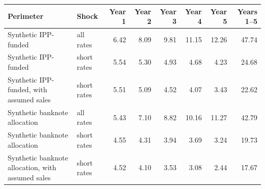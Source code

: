 \begin{tabular}{llrrrrrr}
\toprule
Perimeter & Shock & Year 1 & Year 2 & Year 3 & Year 4 & Year 5 & Years 1--5 \\
\midrule
Synthetic IPP-funded & all rates & 6.42 & 8.09 & 9.81 & 11.15 & 12.26 & 47.74 \\
Synthetic IPP-funded & short rates & 5.54 & 5.30 & 4.93 & 4.68 & 4.23 & 24.68 \\
Synthetic IPP-funded, with assumed sales & short rates & 5.51 & 5.09 & 4.52 & 4.07 & 3.43 & 22.62 \\
Synthetic banknote allocation & all rates & 5.43 & 7.10 & 8.82 & 10.16 & 11.27 & 42.79 \\
Synthetic banknote allocation & short rates & 4.55 & 4.31 & 3.94 & 3.69 & 3.24 & 19.73 \\
Synthetic banknote allocation, with assumed sales & short rates & 4.52 & 4.10 & 3.53 & 3.08 & 2.44 & 17.67 \\
\bottomrule
\end{tabular}
